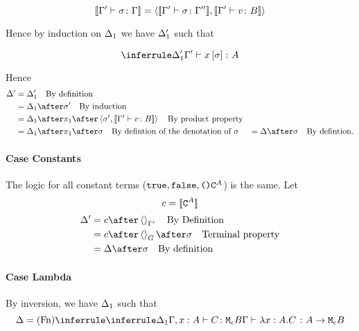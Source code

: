 {    \begin{equation}
        {\bf [\![}\Gamma' \vdash \sigma \colon \Gamma{\bf ]\!]} = \left\langle{\bf [\![}\Gamma' \vdash \sigma \colon \Gamma''{\bf ]\!]}, {\bf [\![}\Gamma' \vdash v \colon B{\bf ]\!]}\right\rangle
    \end{equation}

    Hence by induction on $\Delta_1$ we have $\Delta_1'$ such that

    \begin{equation}
        \treeruleI{\D_1'}{\typerelation{\G'}{x\ssi}{A}}
    \end{equation}



    Hence
    \begin{align}
        \D' & = \D_1' \qt{By definition}\\
            & = \D_1\after\si'\qt{By induction}\\
            & = \D_1\after\p\after\pr{\si'}{\deno{\typerelation{\G'}{v}{B}}}\qt{By product property}\\
            & = \D_1\after\p\after\si\qt{By defintion of the denotation of $\si$}
            & = \D\after\si\qt{By defintion.}
    \end{align}

    \paragraph{Case Constants}
    The logic for all constant terms ($\texttt{true},\texttt{false},\texttt{()}\texttt{C}^{A}$) is the same.
    Let
    \begin{equation}
        c = {\bf [\![}\texttt{C}^{A}{\bf ]\!]}
    \end{equation}
    \begin{align}
        \D' & = c\after\term{\G'}\qt{By Definition}\\
            & = c\after\term{G}\after\si\qt{Terminal property}\\
            & = \D\after\si\qt{By definition}
    \end{align}
    \paragraph{Case Lambda}

    By inversion, we have $\Delta_1$ such that
    \begin{equation}
        \D = \ntreeruleI{Fn}{
            \treeruleI{\D_1}{\typerelation{\G, x:A}{C}{\meb}}
        }{\typerelation{\G}{\lam{x}{A}{C}}{\aeb}}
    \end{equation}

}
